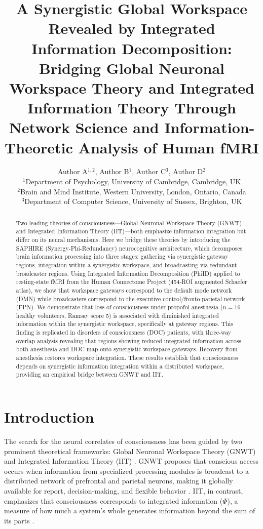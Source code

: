 \documentclass[11pt]{article}
\title{A Synergistic Global Workspace Revealed by Integrated Information Decomposition: Bridging Global Neuronal Workspace Theory and Integrated Information Theory Through Network Science and Information-Theoretic Analysis of Human fMRI}
\author{Author A$^{1,2}$, Author B$^{1}$, Author C$^{3}$, Author D$^{2}$ \\
\small $^{1}$Department of Psychology, University of Cambridge, Cambridge, UK \\
\small $^{2}$Brain and Mind Institute, Western University, London, Ontario, Canada \\
\small $^{3}$Department of Computer Science, University of Sussex, Brighton, UK}
\date{}
\begin{document}
\maketitle

\begin{abstract}
Two leading theories of consciousness---Global Neuronal Workspace Theory (GNWT) and Integrated Information Theory (IIT)---both emphasize information integration but differ on its neural mechanisms. Here we bridge these theories by introducing the SAPHIRE (Synergy-Phi-Redundancy) neurocognitive architecture, which decomposes brain information processing into three stages: gathering via synergistic gateway regions, integration within a synergistic workspace, and broadcasting via redundant broadcaster regions. Using Integrated Information Decomposition (PhiID) applied to resting-state fMRI from the Human Connectome Project (454-ROI augmented Schaefer atlas), we show that workspace gateways correspond to the default mode network (DMN) while broadcasters correspond to the executive control/fronto-parietal network (FPN). We demonstrate that loss of consciousness under propofol anesthesia ($n = 16$ healthy volunteers, Ramsay score 5) is associated with diminished integrated information within the synergistic workspace, specifically at gateway regions. This finding is replicated in disorders of consciousness (DOC) patients, with three-way overlap analysis revealing that regions showing reduced integrated information across both anesthesia and DOC map onto synergistic workspace gateways. Recovery from anesthesia restores workspace integration. These results establish that consciousness depends on synergistic information integration within a distributed workspace, providing an empirical bridge between GNWT and IIT.
\end{abstract}

\section{Introduction}

The search for the neural correlates of consciousness has been guided by two prominent theoretical frameworks: Global Neuronal Workspace Theory (GNWT) and Integrated Information Theory (IIT) \citep{dehaene2011experimental, tononi2016integrated}. GNWT proposes that conscious access occurs when information from specialized processing modules is broadcast to a distributed network of prefrontal and parietal neurons, making it globally available for report, decision-making, and flexible behavior \citep{baars2005global, dehaene2011experimental}. IIT, in contrast, emphasizes that consciousness corresponds to integrated information ($\Phi$), a measure of how much a system's whole generates information beyond the sum of its parts \citep{tononi2016integrated, oizumi2014phenomenology}.
\end{document}
